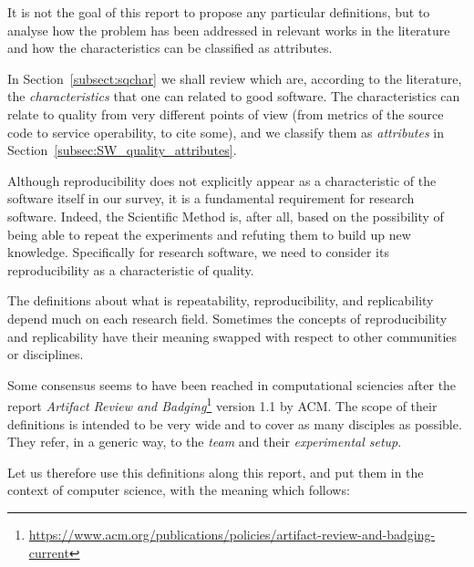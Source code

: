 It is not the goal of this report to propose any particular definitions, but to analyse how the problem has been addressed in relevant works in the literature and how the characteristics can be classified as attributes.

In Section~\ref{subsect:sqchar} we shall review which are, according to the literature, the \textit{characteristics} that one can related to good software. The characteristics can relate to quality from very different points of view (from metrics of the source code to service operability, to cite some), and we classify them as \textit{attributes} in Section~\ref{subsec:SW_quality_attributes}.

Although reproducibility does not explicitly appear as a characteristic of the software itself in our survey, it is a fundamental requirement for research software. Indeed, the Scientific Method is, after all, based on the possibility of being able to repeat the experiments and refuting them to build up new knowledge. Specifically for research software, we need to consider its reproducibility as a characteristic of quality.

The definitions about what is repeatability, reproducibility, and replicability depend much on each research field. Sometimes the concepts of reproducibility and replicability have their meaning swapped with respect to other communities or disciplines.

Some consensus seems to have been reached in computational sciencies after the report \textit{Artifact Review and Badging}\footnote{\url{https://www.acm.org/publications/policies/artifact-review-and-badging-current}} version 1.1 by ACM. The scope of their definitions is intended to be very wide and to cover as many disciples as possible. They refer, in a generic way, to the \textit{team} and their \textit{experimental setup}.

Let us therefore use this definitions along this report, and put them in the context of computer science, with the meaning which follows:

